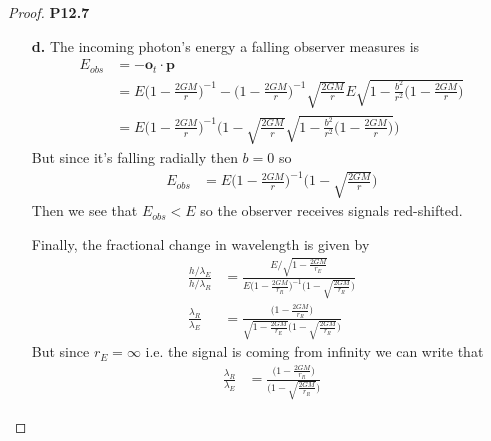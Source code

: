 \documentclass[11pt]{article}
\theoremstyle{definition}
\begin{document}
\begin{proof}{\textbf{P12.7}}
\begin{itemize}
    \item[\textbf{d.}]
    The incoming photon's energy a falling observer measures is
    \begin{align*}
        E_{obs} &= - \bm{o}_t \cdot \bm{p}\\
        &= E\bigg(1 - \frac{2GM}{r}\bigg)^{-1} - \bigg(1 - \frac{2GM}{r}\bigg)^{-1}
        \sqrt{\frac{2GM}{r}}E\sqrt{1 - \frac{b^2}{r^2}\bigg(1 - \frac{2GM}{r}\bigg)}\\
        &= E\bigg(1 - \frac{2GM}{r}\bigg)^{-1}
        \bigg(1 - \sqrt{\frac{2GM}{r}}
        \sqrt{1 - \frac{b^2}{r^2}\bigg(1 - \frac{2GM}{r}\bigg)}\bigg)
    \end{align*}
    But since it's falling radially then $b = 0$ so
    \begin{align*}
        E_{obs} &= E\bigg(1 - \frac{2GM}{r}\bigg)^{-1}
        \bigg(1 - \sqrt{\frac{2GM}{r}}\bigg)
    \end{align*}
    Then we see that $E_{obs} < E$ so the observer receives signals red-shifted.

    Finally, the fractional change in wavelength is given by
    \begin{align*}
        \frac{h/\lambda_E}{h/\lambda_R}
        &= \frac{E/\sqrt{1 - \frac{2GM}{r_E}}}{E\bigg(1 - \frac{2GM}{r_R}\bigg)^{-1}
        \bigg(1 - \sqrt{\frac{2GM}{r_R}}\bigg)}\\
        \frac{\lambda_R}{\lambda_E}
        &= \frac{\bigg(1 - \frac{2GM}{r_R}\bigg)}{\sqrt{1 - \frac{2GM}{r_E}}
        \bigg(1 - \sqrt{\frac{2GM}{r_R}}\bigg)}
    \end{align*}
    But since $r_E = \infty$ i.e. the signal is coming from infinity
    we can write that
    \begin{align*}
        \frac{\lambda_R}{\lambda_E}
        &= \frac{\bigg(1 - \frac{2GM}{r_R}\bigg)}
        {\bigg(1 - \sqrt{\frac{2GM}{r_R}}\bigg)}
    \end{align*}
\end{itemize}
\end{proof}
\cleardoublepage
\end{document}
